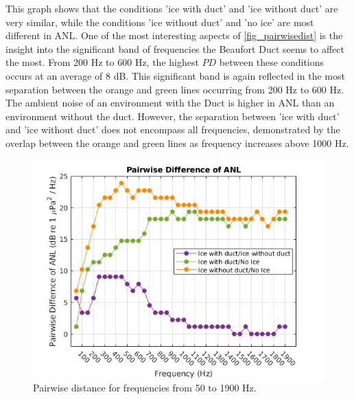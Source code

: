 This graph shows that the conditions 'ice with duct' and 'ice without duct' are very similar, while the conditions 'ice without duct' and 'no ice' are most different in ANL. One of the most interesting aspects of \autoref{fig_pairwisedist} is the insight into the significant band of frequencies the Beaufort Duct seems to affect the most. From 200 Hz to 600 Hz, the highest $PD$ between these conditions occurs at an average of 8 dB. This significant band is again reflected in the most separation between the orange and green lines occurring from 200 Hz to 600 Hz. The ambient noise of an environment with the Duct is higher in ANL than an environment without the duct. However, the separation between 'ice with duct' and 'ice without duct' does not encompass all frequencies, demonstrated by the overlap between the orange and green lines as frequency increases above 1000 Hz.

\begin{figure}[p]
\centering
\includegraphics[scale=0.6]{Figures/recolor_pairwise_dist_ANLs2.jpg}
\caption{Pairwise distance for frequencies from 50 to 1900 Hz.}
\label{fig_pairwisedist}
\end{figure}


